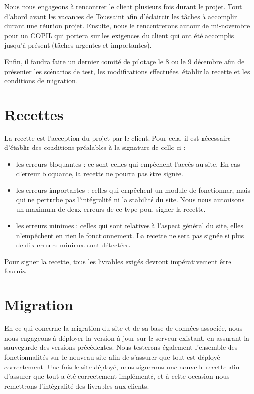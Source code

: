 \documentclass[11pt]{report}
\begin{document}
 \par Nous nous engageons à rencontrer le client plusieurs fois durant le
 projet. Tout d'abord avant les vacances de Toussaint afin d'éclaircir les
 tâches à accomplir durant une réunion projet. Ensuite, nous le rencontrerons
 autour de mi-novembre pour un COPIL qui portera sur les exigences du client qui
 ont été accomplis jusqu'à présent (tâches urgentes et importantes). 
 \par Enfin, il
 faudra faire un dernier comité de pilotage le 8 ou le 9 décembre afin de
 présenter les scénarios de test, les modifications effectuées, établir la
recette et les conditions de migration.
\section{Recettes}
 La recette est l'acception du projet par le client. Pour cela, il est
nécessaire d'établir des conditions préalables à la signature de celle-ci : \\
\begin{itemize}
 \item les erreurs bloquantes : ce sont celles qui empêchent l'accès au site.
 En cas d'erreur bloquante, la recette ne pourra pas être signée. \\
  \item les erreurs importantes : celles qui empêchent un module de fonctionner,
  mais qui ne perturbe pas l'intégralité ni la stabilité du site. Nous nous
 autorisons un maximum de deux erreurs de ce type pour signer la recette. \\
  \item les erreurs minimes : celles qui sont relatives à l'aspect général du
  site, elles n’empêchent en rien le fonctionnement. La recette ne sera pas
  signée si plus de dix erreurs minimes sont détectées. \\
\end{itemize}

\par Pour signer la recette, tous les livrables exigés devront impérativement
être fournis.

\section{Migration}
 En ce qui concerne la migration du site et de sa base de données associée, nous
 nous engageons à déployer la version à jour sur le serveur existant, en
 assurant la sauvegarde des versions précédentes. Nous testerons également
 l'ensemble des fonctionnalités sur le nouveau site afin de s'assurer que tout
 est déployé correctement.
 Une fois le site déployé, nous signerons une nouvelle recette afin d'assurer
que tout a été correctement implémenté, et à cette occasion nous remettrons 
l'intégralité des livrables aux clients.
\end{document}
